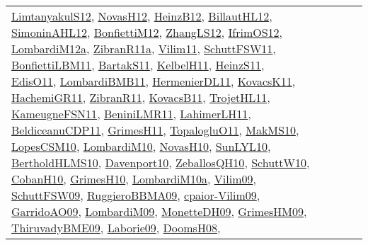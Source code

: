 {\begin{longtable}{lp{3cm}>{\raggedright}p{6cm}>{\raggedright}p{6cm}p{8cm}}
\href{articles/LimtanyakulS12.pdf}{LimtanyakulS12}\cite{LimtanyakulS12}, \href{articles/NovasH12.pdf}{NovasH12}\cite{NovasH12}, \href{papers/HeinzB12.pdf}{HeinzB12}\cite{HeinzB12}, \href{papers/BillautHL12.pdf}{BillautHL12}\cite{BillautHL12}, \href{papers/SimoninAHL12.pdf}{SimoninAHL12}\cite{SimoninAHL12}, \href{papers/BonfiettiM12.pdf}{BonfiettiM12}\cite{BonfiettiM12}, \href{papers/ZhangLS12.pdf}{ZhangLS12}\cite{ZhangLS12}, \href{papers/IfrimOS12.pdf}{IfrimOS12}\cite{IfrimOS12}, \href{articles/LombardiM12a.pdf}{LombardiM12a}\cite{LombardiM12a}, \href{papers/ZibranR11a.pdf}{ZibranR11a}\cite{ZibranR11a}, \href{papers/Vilim11.pdf}{Vilim11}\cite{Vilim11}, \href{articles/SchuttFSW11.pdf}{SchuttFSW11}\cite{SchuttFSW11}, \href{papers/BonfiettiLBM11.pdf}{BonfiettiLBM11}\cite{BonfiettiLBM11}, \href{articles/BartakS11.pdf}{BartakS11}\cite{BartakS11}, \href{articles/KelbelH11.pdf}{KelbelH11}\cite{KelbelH11}, \href{papers/HeinzS11.pdf}{HeinzS11}\cite{HeinzS11}, \href{papers/EdisO11.pdf}{EdisO11}\cite{EdisO11}, \href{papers/LombardiBMB11.pdf}{LombardiBMB11}\cite{LombardiBMB11}, \href{papers/HermenierDL11.pdf}{HermenierDL11}\cite{HermenierDL11}, \href{articles/KovacsK11.pdf}{KovacsK11}\cite{KovacsK11}, \href{articles/HachemiGR11.pdf}{HachemiGR11}\cite{HachemiGR11}, \href{papers/ZibranR11.pdf}{ZibranR11}\cite{ZibranR11}, \href{articles/KovacsB11.pdf}{KovacsB11}\cite{KovacsB11}, \href{articles/TrojetHL11.pdf}{TrojetHL11}\cite{TrojetHL11}, \href{papers/KameugneFSN11.pdf}{KameugneFSN11}\cite{KameugneFSN11}, \href{articles/BeniniLMR11.pdf}{BeniniLMR11}\cite{BeniniLMR11}, \href{papers/LahimerLH11.pdf}{LahimerLH11}\cite{LahimerLH11}, \href{articles/BeldiceanuCDP11.pdf}{BeldiceanuCDP11}\cite{BeldiceanuCDP11}, \href{papers/GrimesH11.pdf}{GrimesH11}\cite{GrimesH11}, \href{articles/TopalogluO11.pdf}{TopalogluO11}\cite{TopalogluO11}, \href{papers/MakMS10.pdf}{MakMS10}\cite{MakMS10}, \href{articles/LopesCSM10.pdf}{LopesCSM10}\cite{LopesCSM10}, \href{papers/LombardiM10.pdf}{LombardiM10}\cite{LombardiM10}, \href{articles/NovasH10.pdf}{NovasH10}\cite{NovasH10}, \href{papers/SunLYL10.pdf}{SunLYL10}\cite{SunLYL10}, \href{papers/BertholdHLMS10.pdf}{BertholdHLMS10}\cite{BertholdHLMS10}, \href{papers/Davenport10.pdf}{Davenport10}\cite{Davenport10}, \href{articles/ZeballosQH10.pdf}{ZeballosQH10}\cite{ZeballosQH10}, \href{papers/SchuttW10.pdf}{SchuttW10}\cite{SchuttW10}, \href{papers/CobanH10.pdf}{CobanH10}\cite{CobanH10}, \href{papers/GrimesH10.pdf}{GrimesH10}\cite{GrimesH10}, \href{articles/LombardiM10a.pdf}{LombardiM10a}\cite{LombardiM10a}, \href{papers/Vilim09.pdf}{Vilim09}\cite{Vilim09}, \href{papers/SchuttFSW09.pdf}{SchuttFSW09}\cite{SchuttFSW09}, \href{articles/RuggieroBBMA09.pdf}{RuggieroBBMA09}\cite{RuggieroBBMA09}, \href{papers/cpaior-Vilim09.pdf}{cpaior-Vilim09}\cite{cpaior-Vilim09}, \href{articles/GarridoAO09.pdf}{GarridoAO09}\cite{GarridoAO09}, \href{papers/LombardiM09.pdf}{LombardiM09}\cite{LombardiM09}, \href{papers/MonetteDH09.pdf}{MonetteDH09}\cite{MonetteDH09}, \href{papers/GrimesHM09.pdf}{GrimesHM09}\cite{GrimesHM09}, \href{papers/ThiruvadyBME09.pdf}{ThiruvadyBME09}\cite{ThiruvadyBME09}, \href{papers/Laborie09.pdf}{Laborie09}\cite{Laborie09}, \href{papers/DoomsH08.pdf}{DoomsH08}\cite{DoomsH08}, 
\end{longtable}}
